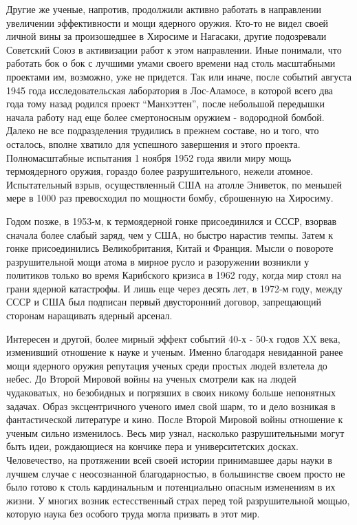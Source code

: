 Другие же ученые, напротив, продолжили активно работать в направлении увеличении эффективности и мощи ядерного оружия.
Кто-то не видел своей личной вины за произошедшее в Хиросиме и Нагасаки, другие подозревали Советский Союз в активизации работ к этом направлении.
Иные понимали, что работать бок о бок с лучшими умами своего времени над столь масштабными проектами им, возможно, уже не придется. 
Так или иначе, после событий августа 1945 года исследовательская лаборатория в Лос-Аламосе, в которой всего два года тому назад родился проект ``Манхэттен'', после небольшой передышки начала работу над еще более смертоносным оружием - водородной бомбой.
Далеко не все подразделения трудились в прежнем составе, но и того, что осталось, вполне хватило для успешного завершения и этого проекта. 
Полномасштабные испытания 1 ноября 1952 года явили миру мощь термоядерного оружия, гораздо более разрушительного, нежели атомное.
Испытательный взрыв, осуществленный США на атолле Эниветок, по меньшей мере в 1000 раз превосходил по мощности бомбу, сброшенную на Хиросиму.

Годом позже, в 1953-м, к термоядерной гонке присоединился и СССР, взорвав сначала более слабый заряд, чем у США, но быстро нарастив темпы. 
Затем к гонке присоединились Великобритания, Китай и Франция.
Мысли о повороте разрушительной мощи атома в мирное русло и разоружении возникли у политиков только во время Карибского кризиса в 1962 году, когда мир стоял на грани ядерной катастрофы. 
И лишь еще через десять лет, в 1972-м году, между СССР и США был подписан первый двусторонний договор, запрещающий сторонам наращивать ядерный арсенал.

Интересен и другой, более мирный эффект событий 40-х - 50-х годов XX века, изменивший отношение к науке и ученым.
Именно благодаря невиданной ранее мощи ядерного оружия репутация ученых среди простых людей взлетела до небес. 
До Второй Мировой войны на ученых смотрели как на людей чудаковатых, но безобидных и погрязших в своих никому больше непонятных задачах. 
Образ эксцентричного ученого имел свой шарм, то и дело возникая в фантастической литературе и кино.
После Второй Мировой войны отношение к ученым сильно изменилось.
Весь мир узнал, насколько разрушительными могут быть идеи, рождающиеся на кончике пера и университетских досках.
Человечество, на протяжении всей своей истории принимавшее дары науки в лучшем случае с неосознанной благодарностью, в большинстве своем просто не было готово к столь кардинальным и потенциально опасным изменениям в их жизни.
У многих возник естесственный страх перед той разрушительной мощью, которую наука без особого труда могла призвать в этот мир. 

